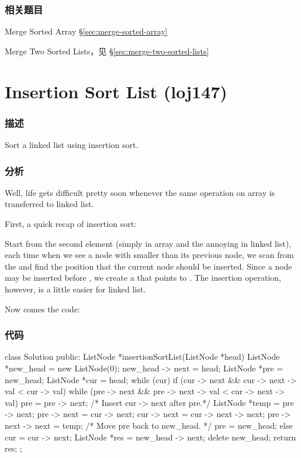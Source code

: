 \subsubsection{相关题目}
\begindot
\item Merge Sorted Array \S \ref{sec:merge-sorted-array}
\item Merge Two Sorted Lists，见 \S \ref{sec:merge-two-sorted-lists}
\myenddot


\section{Insertion Sort List (loj147)} %
\label{sec:Insertion-Sort-List}


\subsubsection{描述}
Sort a linked list using insertion sort.


\subsubsection{分析}
Well, life gets difficult pretty soon whenever the same operation on array is transferred to linked list.

First, a quick recap of insertion sort:

Start from the second element (simply  in array and the annoying  in linked list), each time when we see a node with  smaller than its previous node, we scan from the  and find the position that the current node should be inserted. Since a node may be inserted before , we create a  that points to . The insertion operation, however, is a little easier for linked list.

Now comes the code:


\subsubsection{代码}
\begin{Code}
class Solution {
public:
    ListNode *insertionSortList(ListNode *head) {
        ListNode *new_head = new ListNode(0);
        new_head -> next = head;
        ListNode *pre = new_head;
        ListNode *cur = head;
        while (cur) {
            if (cur -> next && cur -> next -> val < cur -> val) {
                while (pre -> next && pre -> next -> val < cur -> next -> val)
                    pre = pre -> next;
                /* Insert cur -> next after pre.*/
                ListNode *temp = pre -> next;
                pre -> next = cur -> next;
                cur -> next = cur -> next -> next;
                pre -> next -> next = temp;
                /* Move pre back to new_head. */
                pre = new_head;
            } else cur = cur -> next;
        }
        ListNode *res = new_head -> next;
        delete new_head;
        return res;
    }
};
\end{Code}



